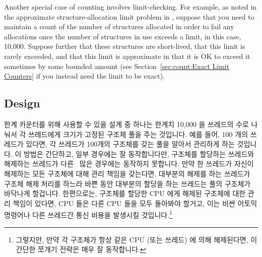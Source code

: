 Another special case of counting involves limit-checking.
For example, as noted in the approximate structure-allocation limit
problem in \QuickQuizRef{\QcountQapproxcnt},
suppose that you need to maintain a count of the number of
structures allocated in order to fail any allocations once the number
of structures in use exceeds a limit, in this case, 10,000.
Suppose further that these structures are short-lived, that this
limit is rarely exceeded, and that this limit is approximate in
that it is OK to exceed it sometimes by some bounded amount
(see Section~\ref{sec:count:Exact Limit Counters}
if you instead need the limit to be exact).
\fi

\subsection{Design}

한계 카운터를 위해 사용할 수 있을 설계 중 하나는 한계치 10,000 을 쓰레드의 수로
나눠서 각 쓰레드에게 크기가 고정된 구조체 풀을 주는 것입니다.
예를 들어, 100 개의 쓰레드가 있다면, 각 쓰레드가 100개의 구조체를 갖는 풀을
알아서 관리하게 하는 것입니다.
이 방법은 간단하고, 일부 경우에는 잘 동작합니다만, 구조체를 할당하는 쓰레드와
해제하는 쓰레드가 다른~\cite{McKenney93} 많은 경우에는 동작하지 못합니다.
만약 한 쓰레드가 자신이 해제하는 모든 구조체에 대해 관리 책임을 갖는다면,
대부분의 해제를 하는 쓰레드가 구조체 해제 처리를 하느라 바쁜 동안 대부분의
할당을 하는 쓰레드는 풀의 구조체가 바닥나게 할겁니다.
한편으로는, 구조체를 할당한 CPU 에게 해제된 구조체에 대한 관리 책임이 있다면,
CPU 들은 다른 CPU 들을 모두 돌아봐야 할거고, 이는 비싼 어토믹 명령어나 다른
쓰레드간 통신 비용을 발생시킬 것입니다.\footnote{
	그렇지만, 만약 각 구조체가 항상 같은 CPU (또는 쓰레드) 에 의해
	해제된다면, 이 간단한 쪼개기 전략은 매우 잘 동작합니다.}

